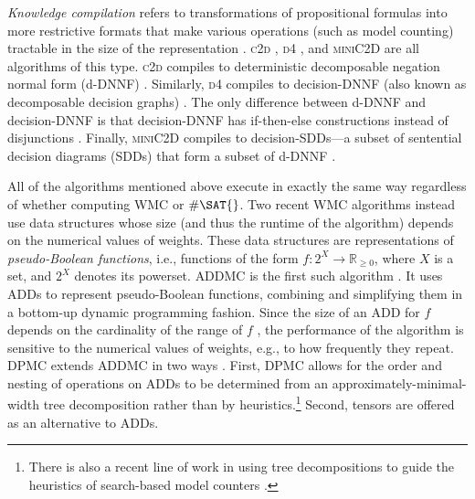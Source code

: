 \emph{Knowledge compilation} refers to transformations of propositional formulas
into more restrictive formats that make various operations (such as model
counting) tractable in the size of the representation
\citep{DBLP:journals/jair/DarwicheM02}.
\textsc{c2d} \citep{DBLP:conf/ecai/Darwiche04},
\textsc{d4} \citep{DBLP:conf/ijcai/LagniezM17}, and
\textsc{miniC2D} \citep{DBLP:conf/ijcai/OztokD15}
are all algorithms of this type. \textsc{c2d} compiles to deterministic
decomposable negation normal form
(d-DNNF) \citep{DBLP:journals/jancl/Darwiche01}. Similarly, \textsc{d4} compiles
to decision-DNNF (also known as decomposable decision
graphs) \citep{DBLP:conf/aaai/FargierM06}. The only difference between d-DNNF and
decision-DNNF is that decision-DNNF has if-then-else constructions instead of
disjunctions \citep{DBLP:conf/ijcai/LagniezM17}. Finally,
\textsc{miniC2D} compiles to decision-SDDs---a
subset of sentential decision diagrams (SDDs) that form a subset of
d-DNNF \citep{DBLP:conf/ijcai/Darwiche11}.

All of the algorithms mentioned above execute in exactly the same way regardless of whether computing \textsf{WMC} or $\#\SAT{}$. Two recent \textsf{WMC} algorithms instead use data structures whose size (and thus the runtime of the algorithm) depends on the numerical values of weights. These data structures are representations of \emph{pseudo-Boolean functions}, i.e., functions of the form $f\colon 2^X \to \mathbb{R}_{\ge 0}$, where $X$ is a set, and $2^X$ denotes its powerset. \textsc{ADDMC} is the first such algorithm \citep{DBLP:conf/aaai/DudekPV20}. It uses ADDs to represent pseudo-Boolean functions, combining and simplifying them in a bottom-up dynamic programming fashion. Since the size of an ADD for $f$ depends on the cardinality of the range of $f$ \citep{DBLP:journals/fmsd/BaharFGHMPS97}, the performance of the algorithm is sensitive to the numerical values of weights, e.g., to how frequently they repeat. \textsc{DPMC} extends \textsc{ADDMC} in two ways \citep{DBLP:conf/cp/DudekPV20}. First, \textsc{DPMC} allows for the order and nesting of operations on ADDs to be determined from an approximately-minimal-width tree decomposition rather than by heuristics.\footnote{There is also a recent line of work in using tree decompositions to guide the heuristics of search-based model counters \citep{DBLP:conf/cp/KorhonenJ21}.} Second, tensors are offered as an alternative to ADDs.

